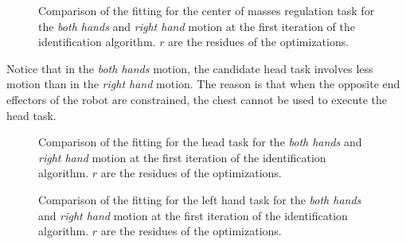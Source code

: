 \documentclass[letterpaper, 10pt, conference]{ieeeconf}      %
\begin{document}

\begin{figure}[t]
  \centering
  \caption{Comparison of the fitting for the center of masses regulation task for the \emph{both hands} and \emph{right hand} motion at the first iteration of the identification algorithm.
  $r$ are the residues of the optimizations.}
  \label{fig:exp1:taskCom0}
\end{figure}

Notice that in the \emph{both hands} motion, the candidate head task involves less motion
than in the \emph{right hand} motion. The reason is that when the opposite end effectors
of the robot are constrained, the chest cannot be used to execute the head task.

\begin{figure}[t]
  \centering
  \caption{Comparison of the fitting for the head task for the
  \emph{both hands} and \emph{right hand} motion at the first
  iteration of the identification algorithm.  $r$ are
  the residues of the optimizations.}
  \label{fig:exp1:taskHead0}
\end{figure}

\begin{figure}[t]
  \centering
  \caption{Comparison of the fitting for the left hand task for the
  \emph{both hands} and \emph{right hand} motion at the first
  iteration of the identification algorithm.  $r$ are
  the residues of the optimizations.}
  \label{fig:exp1:taskLhand0}
\end{figure}
\end{document}
